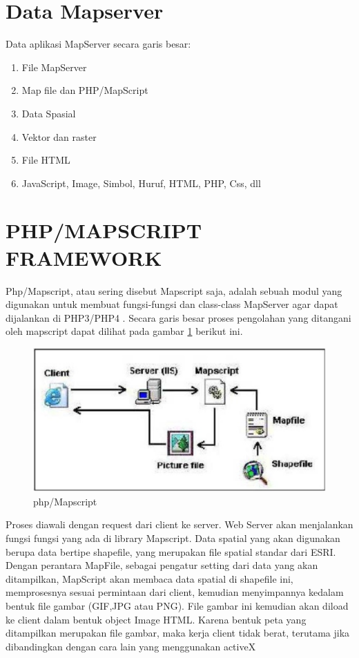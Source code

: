 \section{Data Mapserver}
Data aplikasi MapServer secara garis besar:
\begin{enumerate}
\item File MapServer
\item Map file dan PHP/MapScript
\item Data Spasial
\item Vektor dan raster
\item File HTML
\item JavaScript, Image, Simbol, Huruf, HTML, PHP, Css, dll
\end{enumerate}

\section{PHP/MAPSCRIPT FRAMEWORK}
Php/Mapscript, atau sering disebut Mapscript saja, adalah sebuah modul yang digunakan untuk membuat fungsi-fungsi dan class-class MapServer agar dapat dijalankan di PHP3/PHP4 \cite{baghdadi2015theia}. Secara garis besar proses pengolahan yang ditangani oleh mapscript dapat dilihat pada gambar \ref{php-mapscript} berikut ini.

\begin{figure}[ht]
\centering
\includegraphics[width=1\textwidth]{pictures/php-mapscript}
\caption{php/Mapscript}
\label{php-mapscript}
\end{figure}

Proses diawali dengan request dari client ke server. Web Server akan menjalankan fungsi fungsi yang ada di library Mapscript. Data spatial yang akan digunakan berupa data bertipe shapefile, yang merupakan file spatial standar dari ESRI. Dengan perantara MapFile, sebagai pengatur setting dari data yang akan ditampilkan, MapScript akan membaca data spatial di shapefile ini, memprosesnya sesuai permintaan dari client, kemudian menyimpannya kedalam bentuk file gambar (GIF,JPG atau PNG). File gambar ini kemudian akan diload ke client dalam bentuk object Image HTML. Karena bentuk peta yang ditampilkan merupakan file gambar, maka kerja client tidak berat, terutama jika dibandingkan dengan cara lain yang menggunakan activeX
